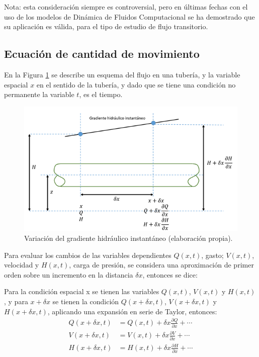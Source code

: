 \documentclass[letterpaper]{report}
\begin{document}
Nota: esta consideración siempre es controversial, pero en últimas fechas con el uso de los modelos de Dinámica de Fluidos Computacional se ha demostrado que su aplicación es válida, 
para el tipo de estudio de flujo transitorio.

\subsection{Ecuación de cantidad de movimiento}
En la Figura \ref{fig:fig18} se describe un esquema del flujo en una tubería, y la variable espacial $x$ en el sentido de la tubería, y dado que se tiene una condición no permanente la variable $t$, 
es el tiempo.\bigskip

\begin{figure}[H]
	\centering
	\includegraphics[width=0.7\linewidth]{fig18}
	\caption{Variación del gradiente hidráulico instantáneo (elaboración propia).}
	\label{fig:fig18}
\end{figure}

Para evaluar los cambios de las variables dependientes $Q(x, t)$, gasto; $V(x,t)$,  velocidad y $H(x,t)$, carga de presión, se considera una aproximación de primer orden sobre un 
incremento en la distancia $\delta x$, entonces se dice:\bigskip

Para la condición espacial x se tienen las variables $Q(x,t)$, $V(x,t)$  y $H(x,t)$ , y para $x+\delta x$ se tienen la condición $Q(x+\delta x,t)$, $V(x+\delta x,t)$  y $H(x+\delta x,t)$, 
aplicando una expansión en serie de Taylor, entonces:
\begin{align}
	Q(x+\delta x,t) & = Q(x,t)+\delta x \frac{\partial Q}{\partial x} + \cdots\\
	V(x+\delta x,t) & = V(x,t)+\delta x \frac{\partial V}{\partial x} + \cdots\\
	H(x+\delta x,t) & = H(x,t)+\delta x \frac{\partial H}{\partial x} + \cdots
\end{align}
\end{document}

